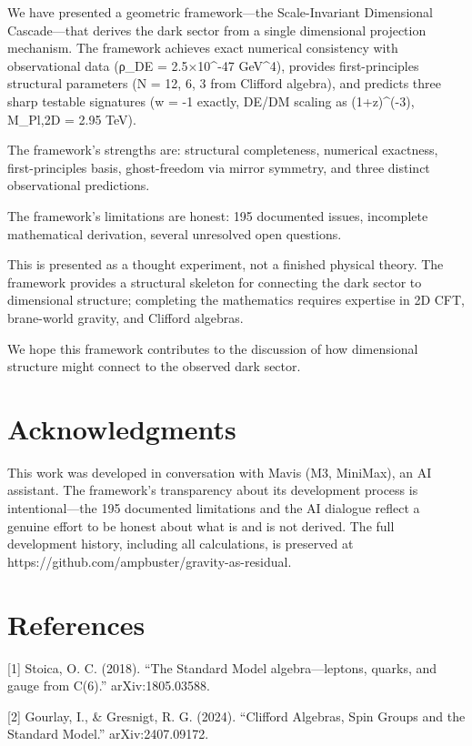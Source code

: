 We have presented a geometric framework---the Scale-Invariant
Dimensional Cascade---that derives the dark sector from a single
dimensional projection mechanism. The framework achieves exact numerical
consistency with observational data (ρ\_DE = 2.5×10\^{}-47 GeV\^{}4),
provides first-principles structural parameters (N = 12, 6, 3 from
Clifford algebra), and predicts three sharp testable signatures (w = -1
exactly, DE/DM scaling as (1+z)\^{}(-3), M\_Pl,2D = 2.95 TeV).

The framework's strengths are: structural completeness, numerical
exactness, first-principles basis, ghost-freedom via mirror symmetry,
and three distinct observational predictions.

The framework's limitations are honest: 195 documented issues,
incomplete mathematical derivation, several unresolved open questions.

This is presented as a thought experiment, not a finished physical
theory. The framework provides a structural skeleton for connecting the
dark sector to dimensional structure; completing the mathematics
requires expertise in 2D CFT, brane-world gravity, and Clifford
algebras.

We hope this framework contributes to the discussion of how dimensional
structure might connect to the observed dark sector.

\hypertarget{acknowledgments}{%
\section{Acknowledgments}\label{acknowledgments}}

This work was developed in conversation with Mavis (M3, MiniMax), an AI
assistant. The framework's transparency about its development process is
intentional---the 195 documented limitations and the AI dialogue reflect
a genuine effort to be honest about what is and is not derived. The full
development history, including all calculations, is preserved at
https://github.com/ampbuster/gravity-as-residual.

\hypertarget{references}{%
\section{References}\label{references}}

{[}1{]} Stoica, O. C. (2018). ``The Standard Model algebra---leptons,
quarks, and gauge from C(6).'' arXiv:1805.03588.

{[}2{]} Gourlay, I., \& Gresnigt, R. G. (2024). ``Clifford Algebras,
Spin Groups and the Standard Model.'' arXiv:2407.09172.

